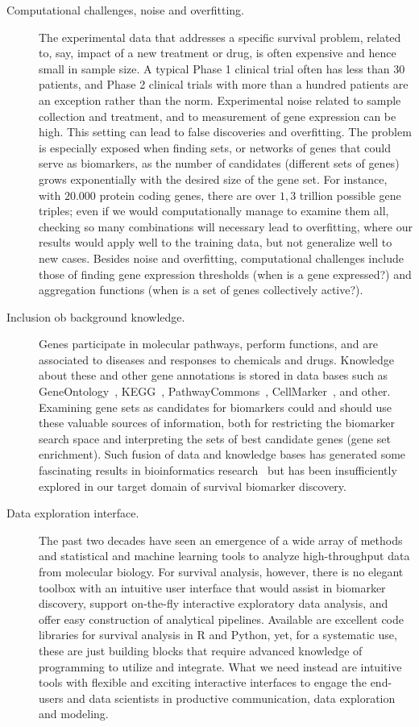 \documentclass[11pt,a4paper]{article}
\begin{document}
\begin{description}
	\item[Computational challenges, noise and overfitting.] The experimental data that addresses a specific survival problem, related to, say, impact of a new treatment or drug, is often expensive and hence small in sample size. A typical Phase 1 clinical trial often has less than 30 patients, and Phase 2 clinical trials with more than a hundred patients are an exception rather than the norm. Experimental noise related to sample collection and treatment, and to measurement of gene expression can be high. This setting can lead to false discoveries and overfitting. The problem is especially exposed when finding sets, or networks of genes that could serve as biomarkers, as the number of candidates (different sets of genes) grows exponentially with the desired size of the gene set. For instance, with $20.000$ protein coding genes, there are over $1,3$ trillion possible gene triples; even if we would computationally manage to examine them all, checking so many combinations will necessary lead to overfitting, where our results would apply well to the training data, but not generalize well to new cases. Besides noise and overfitting, computational challenges include those of finding gene expression thresholds (when is a gene expressed?) and aggregation functions (when is a set of genes collectively active?).
 	\item[Inclusion ob background knowledge.] Genes participate in molecular pathways, perform functions, and are associated to diseases and responses to chemicals and drugs. Knowledge about these and other gene annotations is stored in data bases such as GeneOntology~\cite{}, KEGG~\cite{}, PathwayCommons~\cite{}, CellMarker~\cite{}, and other. Examining gene sets as candidates for biomarkers could and should use these valuable sources of information, both for restricting the biomarker search space and interpreting the sets of best candidate genes (gene set enrichment). Such fusion of data and knowledge bases has generated some fascinating results in bioinformatics research~\cite{} but has been insufficiently explored in our target domain of survival biomarker discovery.
 	\item[Data exploration interface.] The past two decades have seen an emergence of a wide array of methods and statistical and machine learning tools to analyze high-throughput data from molecular biology. For survival analysis, however, there is no elegant toolbox with an intuitive user interface that would assist in biomarker discovery, support on-the-fly interactive exploratory data analysis, and offer easy construction of analytical pipelines. Available are excellent code libraries for survival analysis in R and Python, yet, for a systematic use, these are just building blocks that require advanced knowledge of programming to utilize and integrate. What we need instead are intuitive tools with flexible and exciting interactive interfaces to engage the end-users and data scientists in productive communication, data exploration and modeling.
\end{description}
\end{document}
